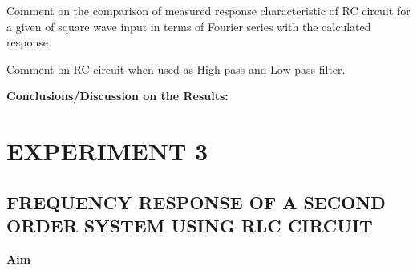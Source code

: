 \documentclass[9pt]{scrreprt}
\begin{document}
\noindent Comment on the comparison of measured response characteristic of RC circuit for a given of square wave input in terms of Fourier series with the calculated response.

\noindent Comment on RC circuit when used as High pass and Low pass filter.

\noindent \textbf{Conclusions/Discussion on the Results:}

\chapter*{\Large EXPERIMENT 3}
\setcounter{chapter}{3}
\setcounter{table}{0}
\section*{\normalsize FREQUENCY RESPONSE OF A SECOND ORDER SYSTEM USING RLC CIRCUIT}
\textbf{Aim}
\end{document}
